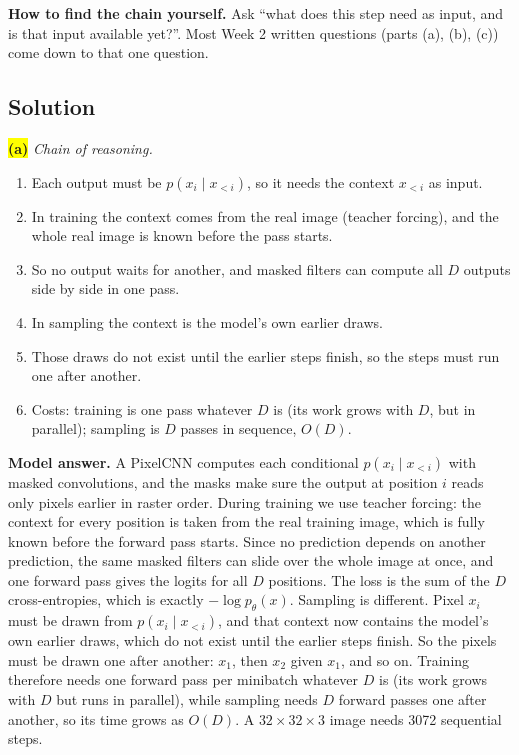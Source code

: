 \documentclass[12pt,a4paper]{article}
\begin{document}
\textbf{How to find the chain yourself.} Ask ``what does this step need as input, and is that input available yet?''. Most Week 2 written questions (parts (a), (b), (c)) come down to that one question.

\subsection{Solution}

\colorbox{yellow}{\textbf{(a)}} \emph{Chain of reasoning.}
\begin{enumerate}[nosep]
  \item Each output must be $p(x_i\mid x_{<i})$, so it needs the context $x_{<i}$ as input.
  \item In training the context comes from the real image (teacher forcing), and the whole real image is known before the pass starts.
  \item So no output waits for another, and masked filters can compute all $D$ outputs side by side in one pass.
  \item In sampling the context is the model's own earlier draws.
  \item Those draws do not exist until the earlier steps finish, so the steps must run one after another.
  \item Costs: training is one pass whatever $D$ is (its work grows with $D$, but in parallel); sampling is $D$ passes in sequence, $O(D)$.
\end{enumerate}

\textbf{Model answer.} A PixelCNN computes each conditional $p(x_i\mid x_{<i})$ with masked convolutions, and the masks make sure the output at position $i$ reads only pixels earlier in raster order. During training we use teacher forcing: the context for every position is taken from the real training image, which is fully known before the forward pass starts. Since no prediction depends on another prediction, the same masked filters can slide over the whole image at once, and one forward pass gives the logits for all $D$ positions. The loss is the sum of the $D$ cross-entropies, which is exactly $-\log p_\theta(x)$. Sampling is different. Pixel $x_i$ must be drawn from $p(x_i\mid x_{<i})$, and that context now contains the model's own earlier draws, which do not exist until the earlier steps finish. So the pixels must be drawn one after another: $x_1$, then $x_2$ given $x_1$, and so on. Training therefore needs one forward pass per minibatch whatever $D$ is (its work grows with $D$ but runs in parallel), while sampling needs $D$ forward passes one after another, so its time grows as $O(D)$. A $32\times32\times3$ image needs 3072 sequential steps.
\end{document}
